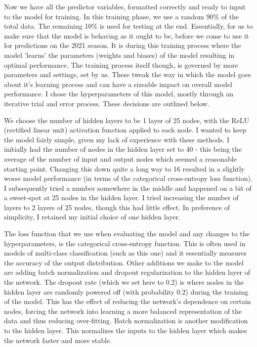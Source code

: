 Now we have all the predictor variables, formatted correctly and ready to input to the model for training. In this training phase, we use a random 90\% of the total data. The remaining 10\% is used for testing at the end. Essentially, for us to make sure that the model is behaving as it ought to be, before we come to use it for predictions on the 2021 season. It is during this training process where the model 'learns' the parameters (weights and biases) of the model resulting in optimal performance. The training process itself though, is governed by more parameters and settings, set by us. These tweak the way in which the model goes about it's learning process and can have a sizeable impact on overall model performance. I chose the hyperparameters of this model, mostly through an iterative trial and error process. These decisions are outlined below.

We choose the number of hidden layers to be 1 layer of 25 nodes, with the ReLU (rectified linear unit) activation function applied to each node. I wanted to keep the model fairly simple, given my lack of experience with these methods. I initially had the number of nodes in the hidden layer set to 40 - this being the average of the number of input and output nodes which seemed a reasonable starting point. Changing this down quite a long way to 16 resulted in a slightly worse model performance (in terms of the categorical cross-entropy loss function). I subsequently tried a number somewhere in the middle and happened on a bit of a sweet-spot at 25 nodes in the hidden layer. I tried increasing the number of layers to 2 layers of 25 nodes, though this had little effect. In preference of simplicity, I retained my initial choice of one hidden layer.

The loss function that we use when evaluating the model and any changes to the hyperparameters, is the categorical cross-entropy function. This is often used in models of multi-class classification (such as this one) and it essentially measures the accuracy of the output distribution. \cite{noauthor_categorical_nodate} Other additions we make to the model are adding batch normalization and dropout regularization to the hidden layer of the network. The dropout rate (which we set here to 0.2) is where nodes in the hidden layer are randomly powered off (with probability 0.2) during the training of the model. This has the effect of reducing the network's dependence on certain nodes, forcing the network into learning a more balanced representation of the data and thus reducing over-fitting. \cite{ghatak_deep_2019} Batch normalization is another modification to the hidden layer. This normalizes the inputs to the hidden layer which makes the network faster and more stable. \cite{ioffe_batch_2015}

